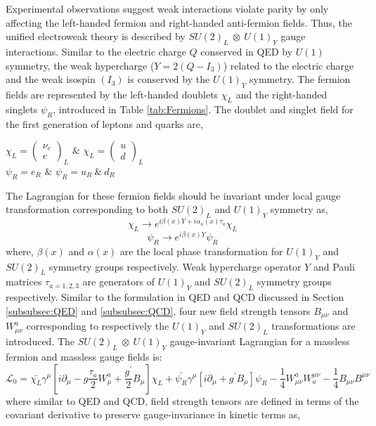 Experimental observations suggest weak interactions violate parity by only affecting the left-handed fermion and right-handed anti-fermion fields. Thus, the unified electroweak theory is described by $SU(2)_{L}~\otimes~U(1)_{Y}$ gauge interactions. Similar to the electric charge $Q$ conserved in QED by $U(1)$ symmetry, the weak hypercharge ($Y=2(Q-I_{3})$) related to the electric charge and the weak isospin $(I_{3})$ is conserved by the $U(1)_{Y}$ symmetry. The fermion fields are represented by the left-handed doublets $\chi_{L}$ and the right-handed singlets $\psi_{R}$, introduced in Table \ref{tab:Fermions}. The doublet and singlet field for the first generation of leptons and quarks are, 

\begin{center}
$ \chi_{L} = \begin{pmatrix} \nu_{e} \\ e\end{pmatrix}_{L}$ \hspace{5pt} $\&$ \hspace{5pt} $ \chi_{L} = \begin{pmatrix}  u \\ d \end{pmatrix}_{L}$ \\
\vspace{5pt}
$ \psi_{R} = e_{R}$ \hspace{10pt} $\&$ \hspace{5pt} $\psi_{R} = u_{R} ~\&~ d_{R}$
\end{center}
The Lagrangian for these fermion fields should be invariant under local gauge transformation corresponding to both $SU(2)_{L}$ and $U(1)_{Y}$ symmetry as, 
\begin{equation}
\chi_{L} \rightarrow e^{i\beta(x)Y+i\alpha_{a}(x)\tau_{a}} \chi_{L}
\label{eqn:SU2LHTransform}
\end{equation}
\begin{equation}
\psi_{R} \rightarrow e^{i\beta(x)Y} \psi_{R}
\label{eqn:SU2RHTransform}
\end{equation}
where, $\beta(x)$ and $\alpha(x)$ are the local phase transformation for $U(1)_{Y}$ and $SU(2)_{L}$ symmetry groups respectively. Weak hypercharge operator $Y$ and Pauli matrices $\tau_{a=1,2,3}$ are generators of $U(1)_{Y}$ and $SU(2)_{L}$ symmetry groups respectively. Similar to the formulation in QED and QCD discussed in Section \ref{subsubsec:QED} and \ref{subsubsec:QCD}, four new field strength tensors $B_{\mu\nu}$ and $W^{a}_{\mu\nu}$ corresponding to respectively the $U(1)_{Y}$ and $SU(2)_{L}$ transformations are introduced. The  $SU(2)_{L}~\otimes~U(1)_{Y}$ gauge-invariant Lagrangian for a massless fermion and massless gauge fields is:
\begin{equation}
\mathcal{L}_{0} = \bar{\chi_{L}}\gamma^{\mu} [i\partial_{\mu} - g \frac{\tau_{a}}{2} W^a_{\mu} + \frac{g^{'}}{2} B_{\mu} ] \chi_{L} + \bar{\psi_{R}} \gamma^{\mu} [ i \partial_{\mu} + g^{'} B_{\mu} ] \psi_{R} - \frac{1}{4} W_{\mu\nu}^{a} W^{\mu\nu}_{a} - \frac{1}{4} B_{\mu\nu} B^{\mu\nu}
\label{eqn:EWKLagrangian1}
\end{equation}
where similar to QED and QCD, field strength tensors are defined in terms of the covariant derivative to preserve gauge-invariance in kinetic terms as,

